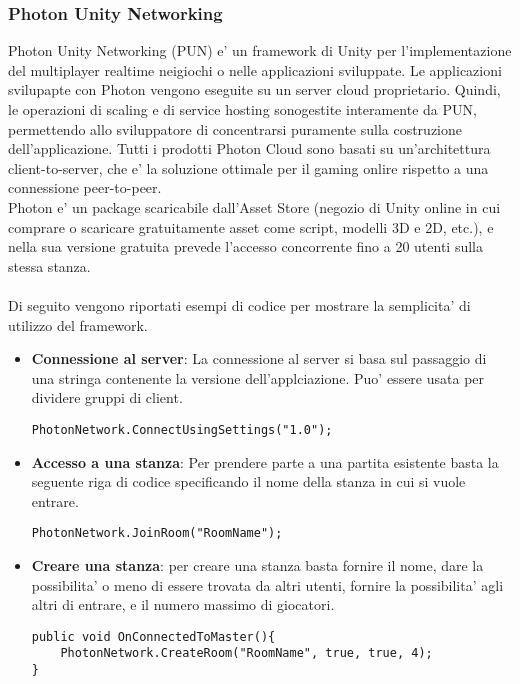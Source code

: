 \subsubsection{Photon Unity Networking}
Photon Unity Networking (PUN) e' un framework di Unity per l'implementazione del multiplayer realtime neigiochi o nelle applicazioni sviluppate. Le applicazioni svilupapte con Photon vengono eseguite su un server cloud proprietario. Quindi, le operazioni di scaling e di service hosting sonogestite interamente da PUN, permettendo allo sviluppatore di concentrarsi puramente sulla costruzione dell'applicazione. Tutti i prodotti Photon Cloud sono basati su un'architettura client-to-server, che e' la soluzione ottimale per il gaming onlire rispetto a una connessione peer-to-peer.\\
Photon e' un package scaricabile dall'Asset Store (negozio di Unity online in cui comprare o scaricare gratuitamente asset come script, modelli 3D e 2D, etc.), e nella sua versione gratuita prevede l'accesso concorrente fino a 20 utenti sulla stessa stanza. \\\\
Di seguito vengono riportati esempi di codice per mostrare la semplicita' di utilizzo del framework.\\
\begin{itemize}
	\item \textbf{Connessione al server}: La connessione al server si basa sul passaggio di una stringa contenente la versione dell'applciazione. Puo' essere usata per dividere gruppi di client.
\begin{lstlisting}
PhotonNetwork.ConnectUsingSettings("1.0");
\end{lstlisting}

	\item \textbf{Accesso a una stanza}: Per prendere parte a una partita esistente basta la seguente riga di codice specificando il nome della stanza in cui si vuole entrare.
\begin{lstlisting}
PhotonNetwork.JoinRoom("RoomName");
\end{lstlisting}

	\item \textbf{Creare una stanza}: per creare una stanza basta fornire il nome, dare la possibilita' o meno di essere trovata da altri utenti, fornire la possibilita' agli altri di entrare, e il numero massimo di giocatori.
\begin{lstlisting}
public void OnConnectedToMaster(){
	PhotonNetwork.CreateRoom("RoomName", true, true, 4);
}

\end{lstlisting}	
	
\end{itemize}

